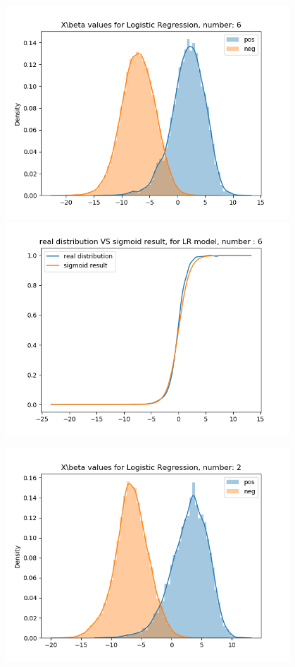 \documentclass{article}
\begin{document}
\begin{figure}[H]
\begin{minipage}{0.19\textwidth}
        \includegraphics[width=0.95\textwidth]{fig/lr/6.png}
        \includegraphics[width=0.95\textwidth]{fig/lr/6-2.png}
    \end{minipage}
    \begin{minipage}{0.19\textwidth}
        \centering
        \includegraphics[width=0.95\textwidth]{fig/lr/2.png}

\end{minipage}
\end{figure}
\end{document}
